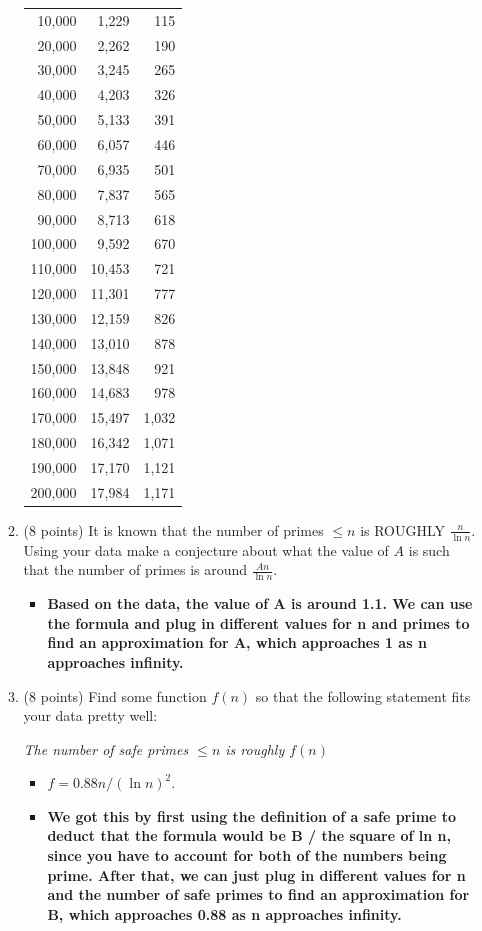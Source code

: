 \documentclass[12pt]{article}
\begin{document}
\begin{enumerate}
\begin{enumerate}
\begin{table}[h!]
\centering
\begin{tabular}{|r|r|r|}
\hline
\hline
10,000  & 1,229   & 115   \\
20,000  & 2,262   & 190   \\
30,000  & 3,245   & 265   \\
40,000  & 4,203   & 326   \\
50,000  & 5,133   & 391   \\
60,000  & 6,057   & 446   \\
70,000  & 6,935   & 501   \\
80,000  & 7,837   & 565   \\
90,000  & 8,713   & 618   \\
100,000 & 9,592   & 670   \\
110,000 & 10,453  & 721   \\
120,000 & 11,301  & 777   \\
130,000 & 12,159  & 826   \\
140,000 & 13,010  & 878   \\
150,000 & 13,848  & 921   \\
160,000 & 14,683  & 978   \\
170,000 & 15,497  & 1,032 \\
180,000 & 16,342  & 1,071 \\
190,000 & 17,170  & 1,121 \\
200,000 & 17,984  & 1,171 \\
\hline
\end{tabular}
\end{table}





\item 
(8 points) 
It is known that the number of primes $\le n$ is ROUGHLY $\frac{n}{\ln n}$. 
Using your data make a conjecture about what the value of $A$ is such that
the number of primes is around $\frac{An}{\ln n}$. 
\begin{itemize}
    \item \textbf{Based on the data, the value of A is around 1.1. We can use the formula and plug in different values for n and primes to find an approximation for A, which approaches 1 as n approaches infinity.}
\end{itemize}
\item
(8 points)
Find some function $f(n)$ so that the following statement fits your data pretty well:

{\it The number of safe primes $\le n$ is roughly $f(n)$ } 
\begin{itemize}
    \item \textbf{$f = 0.88n / (\ln n)^2$}.
    \item \textbf{We got this by first using the definition of a safe prime to deduct that the formula would be B / the square of ln n, since you have to account for both of the numbers being prime. After that, we can just plug in different values for n and the number of safe primes to find an approximation for B, which approaches 0.88 as n approaches infinity.}
\end{itemize}


\end{enumerate}
\end{enumerate}
\end{document}
